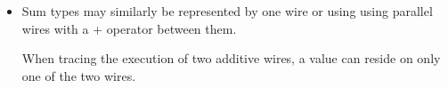 \documentclass[preprint]{sigplanconf}
\begin{document}
{\begin{itemize}
\begin{multicols}{2}
\begin{center}
\end{center}
\begin{center}
\end{center}
\end{multicols}

In the case of products represented by a pair of wires, when tracing
execution using particles, one should think of one value/particle on
each wire.

\item Sum types may similarly be represented by one wire or using using
  parallel wires with a {{+}} operator between them.
\begin{multicols}{2}
\begin{center}
\end{center}
\begin{center}
\end{center}
\end{multicols}


When tracing the execution of two additive wires, a value can reside
on only one of the two wires.


\end{itemize}}
\end{document}
